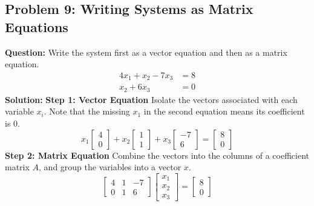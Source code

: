 \documentclass{article}
\begin{document}
\subsection{Problem 9: Writing Systems as Matrix Equations}
\textbf{Question:} Write the system first as a vector equation and then as a matrix equation.
\begin{align*} 
4x_1 + x_2 - 7x_3 &= 8 \\ 
x_2 + 6x_3 &= 0 
\end{align*}
\textbf{Solution:}
\textbf{Step 1: Vector Equation}
Isolate the vectors associated with each variable $x_i$. Note that the missing $x_1$ in the second equation means its coefficient is $0$.
\[ x_1 \begin{bmatrix} 4 \\ 0 \end{bmatrix} + x_2 \begin{bmatrix} 1 \\ 1 \end{bmatrix} + x_3 \begin{bmatrix} -7 \\ 6 \end{bmatrix} = \begin{bmatrix} 8 \\ 0 \end{bmatrix} \]
\textbf{Step 2: Matrix Equation}
Combine the vectors into the columns of a coefficient matrix $A$, and group the variables into a vector $x$.
\[ \begin{bmatrix} 4 & 1 & -7 \\ 0 & 1 & 6 \end{bmatrix} \begin{bmatrix} x_1 \\ x_2 \\ x_3 \end{bmatrix} = \begin{bmatrix} 8 \\ 0 \end{bmatrix} \]
\end{document}
